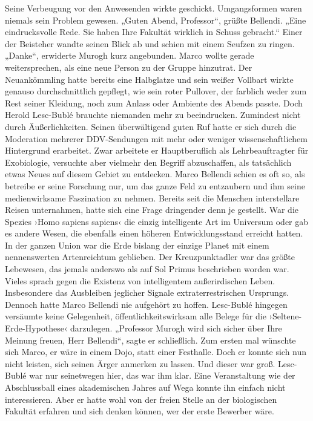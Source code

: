Seine Verbeugung vor den Anwesenden wirkte geschickt. Umgangsformen waren niemals sein Problem gewesen. „Guten Abend, Professor“, grüßte Bellendi. „Eine eindrucksvolle Rede. Sie haben Ihre Fakultät wirklich in Schuss gebracht.“ Einer der Beisteher wandte seinen Blick ab und schien mit einem Seufzen zu ringen.
„Danke“, erwiderte Murogh kurz angebunden.
Marco wollte gerade weitersprechen, als eine neue Person zu der Gruppe hinzutrat. Der Neuankömmling hatte bereits eine Halbglatze und sein weißer Vollbart wirkte genauso durchschnittlich gepflegt, wie sein roter Pullover, der farblich weder zum Rest seiner Kleidung, noch zum Anlass oder Ambiente des Abends passte. Doch Herold Lesc-Bublé brauchte niemanden mehr zu beeindrucken. Zumindest nicht durch Äußerlichkeiten. Seinen überwältigend guten Ruf hatte er sich durch die Moderation mehrerer DDV-Sendungen mit mehr oder weniger wissenschaftlichem Hintergrund erarbeitet.
Zwar arbeitete er Hauptberuflich als Lehrbeauftragter für Exobiologie, versuchte aber vielmehr den Begriff abzuschaffen, als tatsächlich etwas Neues auf diesem Gebiet zu entdecken. Marco Bellendi schien es oft so, als betreibe er seine Forschung nur, um das ganze Feld zu entzaubern und ihm seine medienwirksame Faszination zu nehmen.
Bereits seit die Menschen interstellare Reisen unternahmen, hatte sich eine Frage dringender denn je gestellt. War die Spezies ›Homo sapiens sapiens‹ die einzig intelligente Art im Universum oder gab es andere Wesen, die ebenfalls einen höheren Entwicklungsstand erreicht hatten. In der ganzen Union war die Erde bislang der einzige Planet mit einem nennenswerten Artenreichtum geblieben. Der Kreuzpunktadler war das größte Lebewesen, das jemals anderswo als auf Sol Primus beschrieben worden war.
Vieles sprach gegen die Existenz von intelligentem außerirdischen Leben. Insbesondere das Ausbleiben jeglicher Signale extraterrestrischen Ursprungs. Dennoch hatte Marco Bellendi nie aufgehört zu hoffen. Lesc-Bublé hingegen versäumte keine Gelegenheit, öffentlichkeitswirksam alle Belege für die ›Seltene-Erde-Hypothese‹ darzulegen.
„Professor Murogh wird sich sicher über Ihre Meinung freuen, Herr Bellendi“, sagte er schließlich.
Zum ersten mal wünschte sich Marco, er wäre in einem Dojo, statt einer Festhalle. Doch er konnte sich nun nicht leisten, sich seinen Ärger anmerken zu lassen. Und dieser war groß. Lesc-Bublé war nur seinetwegen hier, das war ihm klar. Eine Veranstaltung wie der Abschlussball eines akademischen Jahres auf Wega konnte ihn einfach nicht interessieren. Aber er hatte wohl von der freien Stelle an der biologischen Fakultät erfahren und sich denken können, wer der erste Bewerber wäre.

